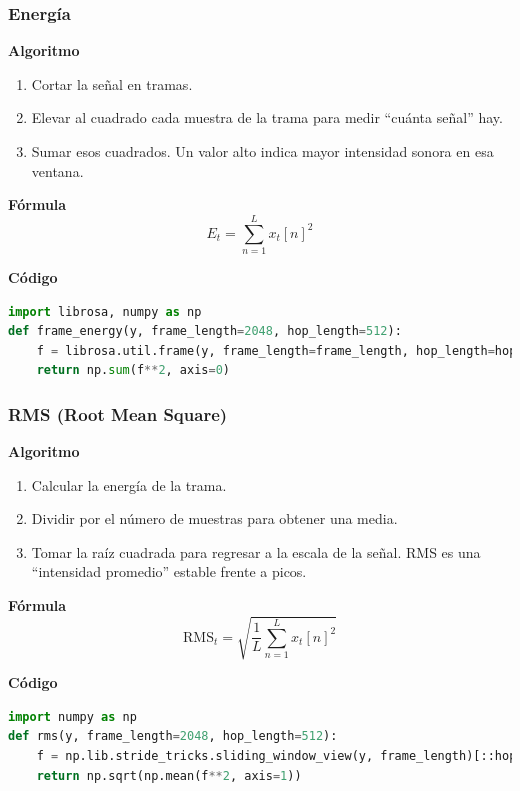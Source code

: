 \subsubsection{Energía}
\textbf{Algoritmo} \parencite{giannakopoulos2014intro, muller2015fmp}
\begin{enumerate}
    \item Cortar la señal en tramas.
    \item Elevar al cuadrado cada muestra de la trama para medir “cuánta señal” hay.
    \item Sumar esos cuadrados. Un valor alto indica mayor intensidad sonora en esa ventana.
\end{enumerate}

\textbf{Fórmula}
\[
E_t = \sum_{n=1}^{L} x_t[n]^2
\]

\textbf{Código}
\begin{lstlisting}[language=Python, label={lst:energy_code}, caption={Energía por tramas}]
import librosa, numpy as np
def frame_energy(y, frame_length=2048, hop_length=512):
    f = librosa.util.frame(y, frame_length=frame_length, hop_length=hop_length)
    return np.sum(f**2, axis=0)
\end{lstlisting}

\subsubsection{RMS (Root Mean Square)}
\textbf{Algoritmo} \parencite{oppenheim2010dsp, muller2015fmp}
\begin{enumerate}
    \item Calcular la energía de la trama.
    \item Dividir por el número de muestras para obtener una media.
    \item Tomar la raíz cuadrada para regresar a la escala de la señal. RMS es una “intensidad promedio” estable frente a picos.
\end{enumerate}

\textbf{Fórmula}
\[
\text{RMS}_t=\sqrt{\frac{1}{L}\sum_{n=1}^{L}x_t[n]^2}
\]

\textbf{Código}
\begin{lstlisting}[language=Python, label={lst:rms_code}, caption={RMS por tramas}]
import numpy as np
def rms(y, frame_length=2048, hop_length=512):
    f = np.lib.stride_tricks.sliding_window_view(y, frame_length)[::hop_length]
    return np.sqrt(np.mean(f**2, axis=1))
\end{lstlisting}

